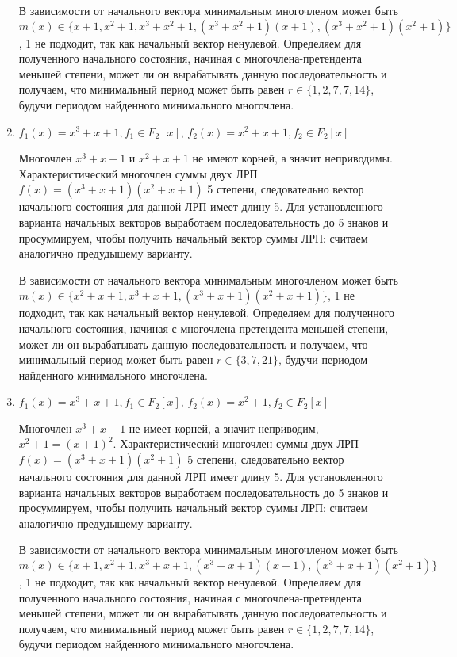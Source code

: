 \documentclass[utf8x, 14pt]{G7-32} %
\begin{document}
\begin{enumerate}
     В зависимости от начального вектора минимальным многочленом может быть $m(x)\in\{x+1, x^2+1, x^3+x^2+1, (x^3+x^2+1)(x+1), (x^3+x^2+1)(x^2+1)\}$, 1 не подходит, так как начальный вектор ненулевой. Определяем для полученного начального состояния, начиная с многочлена-претендента меньшей степени, может ли он вырабатывать данную последовательность и получаем, что минимальный период может быть равен $r \in \{1, 2, 7, 7, 14 \}$, будучи периодом найденного минимального многочлена.
     
     \item $f_1(x) = x^3+x+1, f_1\in F_2[x]$, $f_2(x) = x^2+x+1, f_2\in F_2[x]$
    
     Многочлен $x^3+x+1$ и $x^2+x+1$ не имеют корней, а значит неприводимы. Характеристический многочлен суммы двух ЛРП $f(x) = (x^3+x+1)(x^2+x+1)$ 5 степени, следовательно вектор начального состояния для данной ЛРП имеет длину 5. Для установленного варианта начальных векторов выработаем последовательность до 5 знаков и просуммируем, чтобы получить начальный вектор суммы ЛРП: считаем аналогично предудыщему варианту.
     
     В зависимости от начального вектора минимальным многочленом может быть $m(x)\in\{x^2+x+1, x^3+x+1, (x^3+x+1)(x^2+x+1)\}$, 1 не подходит, так как начальный вектор ненулевой. Определяем для полученного начального состояния, начиная с многочлена-претендента меньшей степени, может ли он вырабатывать данную последовательность и получаем, что минимальный период может быть равен $r \in \{3, 7, 21 \}$, будучи периодом найденного минимального многочлена.
     
     \item $f_1(x) = x^3+x+1, f_1\in F_2[x]$, $f_2(x) = x^2+1, f_2\in F_2[x]$
    
     Многочлен $x^3+x+1$ не имеет корней, а значит неприводим, $x^2+1 = (x+1)^2$. Характеристический многочлен суммы двух ЛРП $f(x) = (x^3+x+1)(x^2+1)$ 5 степени, следовательно вектор начального состояния для данной ЛРП имеет длину 5. Для установленного варианта начальных векторов выработаем последовательность до 5 знаков и просуммируем, чтобы получить начальный вектор суммы ЛРП: считаем аналогично предудыщему варианту.
     
     В зависимости от начального вектора минимальным многочленом может быть $m(x)\in\{x+1, x^2+1, x^3+x+1, (x^3+x+1)(x+1), (x^3+x+1)(x^2+1)\}$, 1 не подходит, так как начальный вектор ненулевой. Определяем для полученного начального состояния, начиная с многочлена-претендента меньшей степени, может ли он вырабатывать данную последовательность и получаем, что минимальный период может быть равен $r \in \{1, 2, 7, 7, 14 \}$, будучи периодом найденного минимального многочлена.
\end{enumerate}
\end{document}
